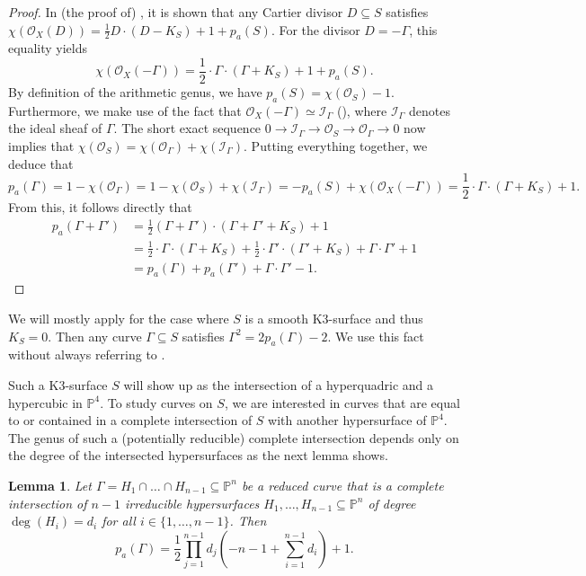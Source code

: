 \documentclass[english,11pt,reqno]{amsart}
\newcommand{\sub}{\subseteq}
\newcommand{\Pfour}{\mathbb{P}^4}
\newcommand{\Pn}{\mathbb{P}^n}
\newtheorem{lem}[thm]{Lemma}
\begin{document}
	\begin{proof}
		In (the proof of) \cite[Thm.\ V.1.6]{Hartshorne}, it is shown that any Cartier divisor $D\sub S$ satisfies $\chi(\mathcal{O}_X(D))=\frac{1}{2}D\cdot (D-K_S)+1+p_a(S)$. For the divisor $D=-\Gamma$, this equality yields 
		$$\chi(\mathcal{O}_X(-\Gamma))=\frac{1}{2}\cdot\Gamma\cdot (\Gamma+K_S)+1+p_a(S).$$
		By definition of the arithmetic genus, we have $p_a(S)=\chi(\mathcal{O}_S)-1$. Furthermore, we make use of the fact that $\mathcal{O}_X(-\Gamma) \simeq \mathcal{I}_\Gamma$ (\cite[Prop.\ II.6.18]{Hartshorne}), where $ \mathcal{I}_\Gamma$ denotes the ideal sheaf of $\Gamma$. The short exact sequence 
		$ 0 \rightarrow \mathcal{I}_\Gamma \rightarrow \mathcal{O}_S \rightarrow \mathcal{O}_{\Gamma} \rightarrow 0$ now implies that $\chi(\mathcal{O}_S)=\chi({\mathcal{O}_{\Gamma}}) + \chi({\mathcal{I}_{\Gamma}}).$ Putting everything together, we deduce that 
		$$ p_a(\Gamma)=1-\chi(\mathcal{O}_{\Gamma})=1-\chi(\mathcal{O}_S)+\chi(\mathcal{I}_{\Gamma})=-p_a(S)+\chi(\mathcal{O}_X(-\Gamma))=\frac{1}{2}\cdot\Gamma\cdot (\Gamma+K_S)+1.$$
		From this, it follows directly that
		\begin{align*}
			p_a(\Gamma + \Gamma')
			&=\frac{1}{2}(\Gamma + \Gamma')\cdot(\Gamma + \Gamma' + K_S)+1 \\
			& = \frac{1}{2}\cdot\Gamma\cdot (\Gamma+K_S) + \frac{1}{2}\cdot\Gamma'\cdot (\Gamma'+K_S) + \Gamma \cdot \Gamma' +1 \\
			& = p_a(\Gamma)+p_a(\Gamma')+\Gamma\cdot \Gamma'-1.
		\end{align*}
	\end{proof}
	We will mostly apply  for the case where $S$ is a smooth K3-surface and thus $K_S=0$. Then any curve $\Gamma \sub S$ satisfies $\Gamma^2 = 2p_a(\Gamma)-2$. We use this fact without always referring to  . \par 
	Such a K3-surface $S$ will show up as the intersection of a hyperquadric and a hypercubic in $\Pfour$. To study curves on $S$, we are interested in curves that are equal to or contained in a complete intersection of $S$ with another hypersurface of $\Pfour$. The genus of such a (potentially reducible) complete intersection depends only on the degree of the intersected hypersurfaces as the next lemma shows.
	\begin{lem} \label{lem:genus_formula_complete_intersection}
		Let $\Gamma = H_1 \cap {\dots} \cap H_{n-1} \sub \Pn$ be a reduced curve that is a complete intersection of $n-1$ irreducible hypersurfaces $H_1,\dots,H_{n-1}\sub \Pn$ of degree $\deg(H_i)=d_i$ for all $i\in\{1,\dots,n-1\}$. Then 
		$$p_a(\Gamma)=\frac{1}{2}\prod_{j=1}^{n-1} d_j \left(-n-1+\sum_{i=1}^{n-1} d_i\right) +1.$$
	\end{lem}
\end{document}

